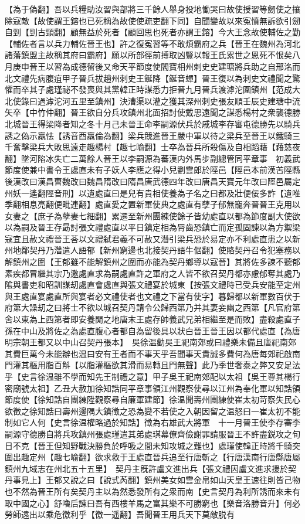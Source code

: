 【為于偽翻】吾以兵糧助汝習與部將三千餘人舉身投地慟哭曰故使授習等劒使之攘除寇敵【故使謂王鎔也已死稱為故使使疏吏翻下同】自聞變故以來寃憤無訴欲引劒自剄【剄古頸翻】顧無益於死者【顧回思也死者亦謂王鎔】今大王念故使輔佐之勤【輔佐者言以兵力輔佐晉王也】許之復寃習等不敢煩霸府之兵【晉王在魏州為河北諸藩鎮盟主故稱其府曰霸府】願以所部徑前搏取凶豎以報王氏累世之恩死不恨矣八月庚申晉王以習為成德留後又命天平節度使閻寶相州刺史史建瑭將兵助之自邢洺而北文禮先病腹疽甲子晉兵拔趙州刺史王鋋降【鋋音蟬】晉王復以為刺史文禮聞之驚懼而卒其子處瑾祕不發喪與其黨韓正時謀悉力拒晉九月晉兵渡滹沱圍鎮州【范成大北使錄曰過滹沱河五里至鎮州】決漕渠以灌之獲其深州刺史張友順壬辰史建瑭中流矢卒【中竹仲翻】晉王欲自分兵攻鎮州北面招討使戴思遠聞之謀悉楊村之衆襲德勝北城晉王得梁降者知之冬十月己未晉王命李嗣源伏兵於戚城李存審屯德勝先以騎兵誘之偽示羸怯【誘音酉羸倫為翻】梁兵競進晉王嚴中軍以待之梁兵至晉王以鐵騎三千奮擊梁兵大敗思遠走趣楊村【趣七喻翻】士卒為晉兵所殺傷及自相蹈藉【藉慈夜翻】墜河陷冰失亡二萬餘人晉王以李嗣源為蕃漢内外馬步副總管同平章事　初義武節度使兼中書令王處直未有子妖人李應之得小兒劉雲郎於陘邑【陘邑本前漢苦陘縣後漢改曰漢昌曹魏改曰魏昌隋改曰隋昌唐武德四年改曰唐昌天寶元年改曰陘邑屬定州妖一遙翻陘音刑】以遺處直曰是兒有貴相使養為子名之曰都及壯便佞多詐【遺唯季翻相息亮翻便毗連翻】處直愛之置新軍使典之處直有孽子郁無寵奔晉晉王克用以女妻之【庶子為孽妻七細翻】累遷至新州團練使餘子皆幼處直以都為節度副大使欲以為嗣及晉王存勗討張文禮處直以平日鎮定相為脣齒恐鎮亡而定孤固諫以為方禦梁寇宜且赦文禮晉王荅以文禮弑君義不可赦又潛引梁兵恐於易定亦不利處直患之以新州地鄰契丹乃濳遣人語郁【新州窮邊也北接契丹語牛倨翻】使賂契丹召令犯塞務以解鎮州之圍【王郁雖不能解鎮州之圍而亦能為契丹鄉導以寇晉】其將佐多諫不聽郁素疾都冒繼其宗乃邀處直求為嗣處直許之軍府之人皆不欲召契丹都亦慮郁奪其處乃隂與書吏和昭訓謀刧處直會處直與張文禮宴於城東【按張文禮時已受兵安能至定州與王處直宴處直所與宴者必文禮使者也文禮之下當有使字】暮歸都以新軍數百伏于府第大譟刧之曰將士不欲以城召契丹請令公歸西第乃并其妻妾幽之西第【凡官府第舍以東為上西第者即安養閒之地唐末王處存帥義武兄弟相繼至是而敗】盡殺處直子孫在中山及將佐之為處直腹心者都自為留後具以狀白晉王晉王因以都代處直【為唐明宗朝王都又以中山召契丹張本】　吳徐温勸吳王祀南郊或曰禮樂未備且唐祀南郊其費巨萬今未能辦也温曰安有王者而不事天乎吾聞事天貴誠多費何為唐每郊祀啟南門灌其樞用脂百斛【以脂灌樞欲其滑而易轉且門無聲】此乃季世奢泰之弊又安足法乎【史言徐温雖不學而知先王制禮之意】甲子吳王祀南郊配以太祖【吳王尊其楊行密廟號太祖】乙丑大赦加徐知誥同平章事領江州觀察使尋以江州為奉化軍以知誥領節度使【徐知誥自團練陞觀察尋自廉軍建節】徐温聞壽州團練使崔太初苛察失民心欲徵之徐知誥曰壽州邊隅大鎮徵之恐為變不若使之入朝因留之温怒曰一崔太初不能制如它人何【史言徐温權略過於知誥】徵為右雄武大將軍　十一月晉王使李存審李嗣源守德勝自將兵攻鎮州張處瑾遣其弟處琪幕僚齊儉謝罪請服晉王不許盡鋭攻之旬日不克【晉王但知野戰決勝負於呼吸之間未知攻城之難也】處瑾使韓正時將千騎突圍出趣定州【趣七喻翻】欲求救于王處直晉兵追至行唐斬之【行唐漢南行唐縣唐屬鎮州九域志在州北五十五里】　契丹主旣許盧文進出兵【張文禮因盧文進求援於契丹事見上】王郁又說之曰【說式芮翻】鎮州美女如雲金帛如山天皇王速往則皆己物也不然為晉王所有矣契丹主以為然悉發所有之衆而南【史言契丹為利所誘而來未有取中國之心】舒嚕后諫曰吾有西樓羊馬之富其樂不可勝窮也【樂音洛勝音升】何必勞師遠出以乘危徼利乎【徼一遥翻】吾聞晉王用兵天下莫敵脱有